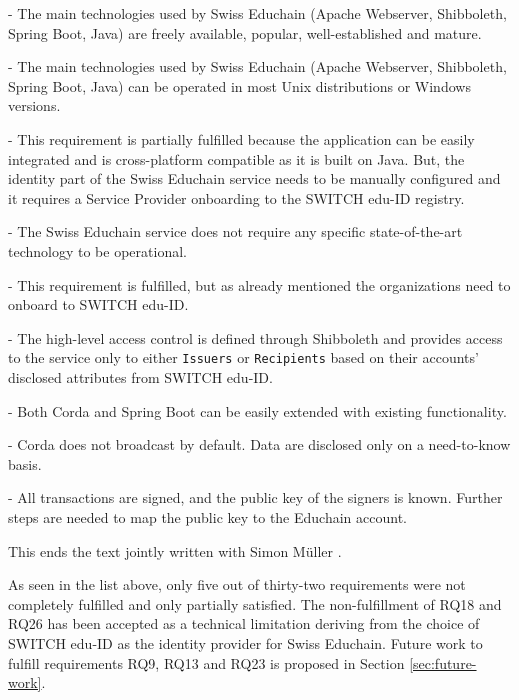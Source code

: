 \begin{description}[leftmargin=40pt]
	\item[RQ24] - The main technologies used by Swiss Educhain (Apache Webserver, Shibboleth, Spring Boot, Java) are freely available, popular, well-established and mature.
	
	\item[RQ25] - The main technologies used by Swiss Educhain (Apache Webserver, Shibboleth, Spring Boot, Java) can be operated in most Unix distributions or Windows versions.
	
	\item[RQ26] - This requirement is partially fulfilled because the application can be easily integrated and is cross-platform compatible as it is built on Java. But, the identity part of the Swiss Educhain service needs to be manually configured and it requires a Service Provider onboarding to the SWITCH edu-ID registry.
	
	\item[RQ27] - The Swiss Educhain service does not require any specific state-of-the-art technology to be operational. 
	
	\item[RQ28] - This requirement is fulfilled, but as already mentioned the organizations need to onboard to SWITCH edu-ID.
	
	\item[RQ29] - The high-level access control is defined through Shibboleth and provides access to the service only to either \texttt{Issuers} or \texttt{Recipients} based on their accounts' disclosed attributes from SWITCH edu-ID.
	
	\item[RQ30] - Both Corda and Spring Boot can be easily extended with existing functionality.
	
	\item[RQ31] - Corda does not broadcast by default. Data are disclosed only on a need-to-know basis.
	
	\item[RQ32] - All transactions are signed, and the public key of the signers is known. Further steps are needed to map the public key to the Educhain account.
	
\end{description}

This ends the text jointly written with Simon M{\"u}ller \cite{mueller20}.

As seen in the list above, only five out of thirty-two requirements were not completely fulfilled and only partially satisfied. The non-fulfillment of RQ18 and RQ26 has been accepted as a technical limitation deriving from the choice of SWITCH edu-ID as the identity provider for Swiss Educhain. Future work to fulfill requirements RQ9, RQ13 and RQ23 is proposed in Section \ref{sec:future-work}.

